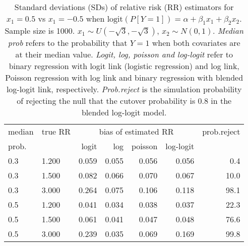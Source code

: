 \documentclass[12pt,a4paper]{article}
\begin{document}
\begin{table}[H] 
\small\sf\centering 
\caption{Standard deviations (SDs) of relative risk (RR) estimators for $x_1=0.5$ vs $x_1=-0.5$ when $\mbox{logit}(P[Y=1])=\alpha+\beta_1 x_1 + \beta_2 x_2$. Sample size is 1000. $x_1 \sim $$U(-\sqrt{3},-\sqrt{3})$, $x_2 \sim N(0,1)$. {\it Median prob} refers to the probability that $Y=1$ when both covariates are at their median value. {\it Logit, log, poisson and log-logit} refer to binary regression with logit link (logistic regression) and log link, Poisson regression with log link and binary regression with blended log-logit link, respectively. {\it Prob.reject} is the simulation probability of rejecting the null that the cutover probability is $0.8$ in the blended log-logit model.} 
\begin{tabular}{llrrrrr} 
\toprule 
median & true RR & \multicolumn{4}{c}{bias of estimated RR} & prob.reject \\ 
prob. & & logit & log & poisson & log-logit  & \\ \midrule 
0.3 & 1.200 & 0.059 & 0.055 & 0.056 & 0.056 &  0.4 \\  
0.3 & 1.500 & 0.082 & 0.066 & 0.070 & 0.067 & 10.0 \\  
0.3 & 3.000 & 0.264 & 0.075 & 0.106 & 0.118 & 98.1 \\  
0.5 & 1.200 & 0.041 & 0.034 & 0.038 & 0.037 & 22.3 \\  
0.5 & 1.500 & 0.061 & 0.041 & 0.047 & 0.048 & 76.6 \\  
0.5 & 3.000 & 0.239 & 0.035 & 0.069 & 0.169 & 99.8 \\  
\bottomrule 
\end{tabular} 
\end{table} 
\end{document}

